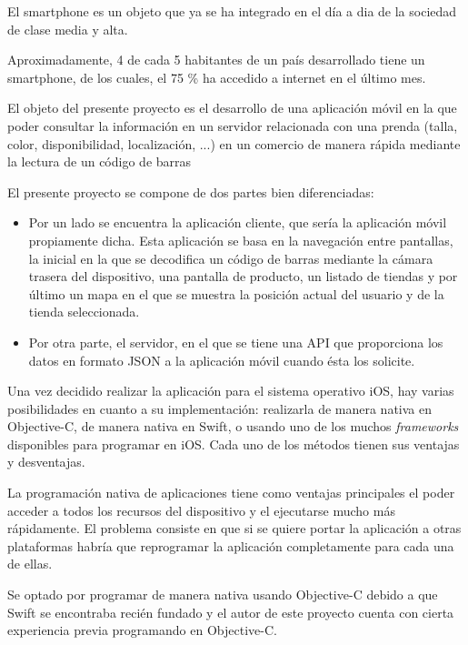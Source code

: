\minitoc

El smartphone es un objeto que ya se ha integrado en el día a dia de la sociedad de clase media y alta.

Aproximadamente, 4 de cada 5 habitantes de un país desarrollado tiene un smartphone, de los cuales, el 75 \% ha accedido a internet en el último mes.


El objeto del presente proyecto es el desarrollo de una aplicación móvil en la que poder consultar la información en un servidor relacionada con una prenda (talla, color, disponibilidad, localización, ...) en un comercio de manera rápida mediante la lectura de un código de barras


El presente proyecto se compone de dos partes bien diferenciadas:

\begin{itemize}
	\item Por un lado se encuentra la aplicación cliente, que sería la aplicación móvil propiamente dicha. Esta aplicación se basa en la navegación entre pantallas, la inicial en la que se decodifica un código de barras mediante la cámara trasera del dispositivo, una pantalla de producto, un listado de tiendas y por último un mapa en el que se muestra la posición actual del usuario y de la tienda seleccionada.
	\item Por otra parte, el servidor, en el que se tiene una API que proporciona los datos en formato JSON a la aplicación móvil cuando ésta los solicite.
\end{itemize}

Una vez decidido realizar la aplicación para el sistema operativo iOS, hay varias posibilidades en cuanto a su implementación: realizarla de manera nativa en Objective-C, de manera nativa en Swift, o usando uno de los muchos \textit{frameworks} disponibles para programar en iOS. Cada uno de los métodos tienen sus ventajas y desventajas.

La programación nativa de aplicaciones tiene como ventajas principales el poder acceder a todos los recursos del dispositivo y el ejecutarse mucho más rápidamente. El problema consiste en que si se quiere portar la aplicación a otras plataformas habría que reprogramar la aplicación completamente para cada una de ellas.

Se optado por programar de manera nativa usando Objective-C debido a que Swift se encontraba recién fundado y el autor de este proyecto cuenta con cierta experiencia previa programando en Objective-C.

